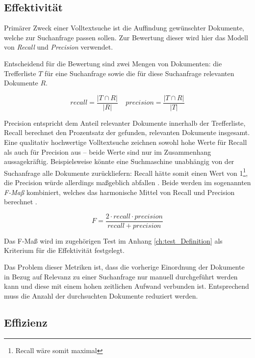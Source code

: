 \subsection{Effektivität}
\label{sec:eval:effectivity}

Primärer Zweck einer Volltextsuche ist die Auffindung gewünschter Dokumente, welche zur Suchanfrage passen sollen. Zur Bewertung dieser wird hier das Modell von \emph{Recall} und \emph{Precision} verwendet.

Entscheidend für die Bewertung sind zwei Mengen von Dokumenten: die Trefferliste $T$ für eine Suchanfrage sowie die für diese Suchanfrage relevanten Dokumente $R$.

\begin{equation}
	recall = \frac{|T \cap R|}{|R|} ~~~~~ precision = \frac{|T \cap R|}{|T|}
\end{equation}

Precision entspricht dem Anteil relevanter Dokumente innerhalb der Trefferliste, Recall berechnet den Prozentsatz der gefunden, relevanten Dokumente insgesamt. Eine qualitativ hochwertige Volltextsuche zeichnen sowohl hohe Werte für Recall als auch für Precision aus -- beide Werte sind nur im Zusammenhang aussagekräftig. Beispielsweise könnte eine Suchmaschine unabhängig von der Suchanfrage alle Dokumente zurückliefern: Recall hätte somit einen Wert von 1\footnote{Recall wäre somit maximal}, die Precision würde allerdings maßgeblich abfallen \cite[S. 407]{Buttcher.2010}. Beide werden im sogenannten \emph{F-Maß} kombiniert, welches das harmonische Mittel von Recall und Precision berechnet \cite[S. 68]{Belaid.2015}.

\begin{equation}
	F = \frac{2 \cdot recall \cdot precision}{recall + precision}
\end{equation}

Das F-Maß wird im zugehörigen Test im Anhang \ref{ch:test_Definition} als Kriterium für die Effektivität festgelegt.

Das Problem dieser Metriken ist, dass die vorherige Einordnung der Dokumente in Bezug auf Relevanz zu einer Suchanfrage nur manuell durchgeführt werden kann und diese mit einem hohen zeitlichen Aufwand verbunden ist. Entsprechend muss die Anzahl der durchsuchten Dokumente reduziert werden.

\subsection{Effizienz}
\label{sec:eval_effizienz}

